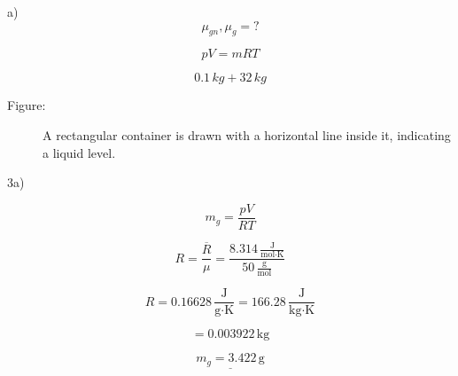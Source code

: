 a)
\[
\mu_{gn}, \mu_g = ?
\]

\[
pV = mRT
\]

\[
0.1 \, kg + 32 \, kg
\]

\begin{description}
    \item[Figure:] A rectangular container is drawn with a horizontal line inside it, indicating a liquid level.
\end{description}

3a)

\[
m_g = \frac{pV}{RT}
\]

\[
R = \frac{\overline{R}}{\mu} = \frac{8.314 \, \frac{\text{J}}{\text{mol} \cdot \text{K}}}{50 \, \frac{\text{g}}{\text{mol}}}
\]

\[
R = 0.16628 \, \frac{\text{J}}{\text{g} \cdot \text{K}} = 166.28 \, \frac{\text{J}}{\text{kg} \cdot \text{K}}
\]

\[
= 0.003922 \, \text{kg}
\]

\[
\underline{m_g = 3.422 \, \text{g}}
\]